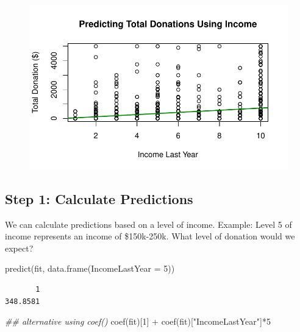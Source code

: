 \documentclass[
  letterpaper,
  DIV=11,
  numbers=noendperiod]{scrreprt}
\newenvironment{Shaded}{\begin{snugshade}}{\end{snugshade}}
\newcommand{\AttributeTok}[1]{\textcolor[rgb]{0.40,0.45,0.13}{#1}}
\newcommand{\DecValTok}[1]{\textcolor[rgb]{0.68,0.00,0.00}{#1}}
\newcommand{\DocumentationTok}[1]{\textcolor[rgb]{0.37,0.37,0.37}{\textit{#1}}}
\newcommand{\FunctionTok}[1]{\textcolor[rgb]{0.28,0.35,0.67}{#1}}
\newcommand{\NormalTok}[1]{\textcolor[rgb]{0.00,0.23,0.31}{#1}}
\newcommand{\SpecialCharTok}[1]{\textcolor[rgb]{0.37,0.37,0.37}{#1}}
\newcommand{\StringTok}[1]{\textcolor[rgb]{0.13,0.47,0.30}{#1}}
\begin{document}
\begin{figure}[H]

{\centering \includegraphics{08-Regression_files/figure-pdf/unnamed-chunk-20-1.pdf}

}

\end{figure}

\hypertarget{step-1-calculate-predictions}{%
\subsection{Step 1: Calculate
Predictions}\label{step-1-calculate-predictions}}

We can calculate predictions based on a level of income. Example: Level
5 of income represents an income of \$150k-250k. What level of donation
would we expect?

\begin{Shaded}
\begin{Highlighting}[]
\FunctionTok{predict}\NormalTok{(fit, }\FunctionTok{data.frame}\NormalTok{(}\AttributeTok{IncomeLastYear =} \DecValTok{5}\NormalTok{))}
\end{Highlighting}
\end{Shaded}

\begin{verbatim}
       1 
348.8581 
\end{verbatim}

\begin{Shaded}
\begin{Highlighting}[]
\DocumentationTok{\#\# alternative using coef()}
\FunctionTok{coef}\NormalTok{(fit)[}\DecValTok{1}\NormalTok{] }\SpecialCharTok{+} \FunctionTok{coef}\NormalTok{(fit)[}\StringTok{"IncomeLastYear"}\NormalTok{]}\SpecialCharTok{*}\DecValTok{5}
\end{Highlighting}
\end{Shaded}
\end{document}
